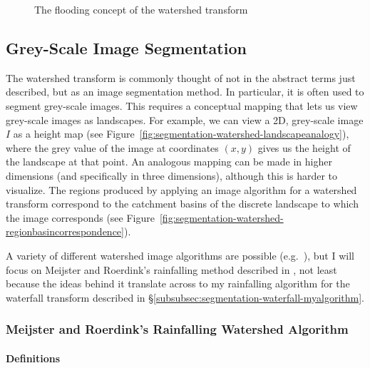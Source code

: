 \begin{figure}[t]
\begin{center}
\end{center}
\caption{The flooding concept of the watershed transform}
\label{fig:segmentation-watershed-floodingconcept}
\end{figure}

\subsection{Grey-Scale Image Segmentation}
\label{subsec:segmentation-watershed-greyscale}

The watershed transform is commonly thought of not in the abstract terms just described, but as an image segmentation method. In particular, it is often used to segment grey-scale images. This requires a conceptual mapping that lets us view grey-scale images as landscapes. For example, we can view a 2D, grey-scale image $I$ as a height map (see Figure~\ref{fig:segmentation-watershed-landscapeanalogy}), where the grey value of the image at coordinates $(x,y)$ gives us the height of the landscape at that point. An analogous mapping can be made in higher dimensions (and specifically in three dimensions), although this is harder to visualize. The regions produced by applying an image algorithm for a watershed transform correspond to the catchment basins of the discrete landscape to which the image corresponds (see Figure~\ref{fig:segmentation-watershed-regionbasincorrespondence}).



A variety of different watershed image algorithms are possible (e.g.~\cite{bieniek00,meijster98,osma-ruiz06,rambabu07,stoev00}), but I will focus on Meijster and Roerdink's rainfalling method described in \cite{meijster98}, not least because the ideas behind it translate across to my rainfalling algorithm for the waterfall transform described in \S\ref{subsubsec:segmentation-waterfall-myalgorithm}.

\subsubsection{Meijster and Roerdink's Rainfalling Watershed Algorithm}

\paragraph{Definitions}

